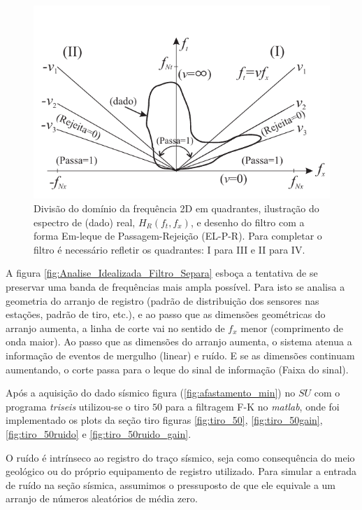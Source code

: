 \begin{figure}[H]
\centering
\includegraphics[width=12cm]{figuras/cap2/Filtro_velocidade.pdf}
\vspace{-0.3cm}
\caption{Divisão do domínio da frequência 2D em quadrantes, ilustração do espectro de (dado) real, $H_{R}(f_{t},f_{x})$, e desenho do filtro com a forma Em-leque de Passagem-Rejeição (EL-P-R). 
Para completar o filtro é necessário refletir os quadrantes: I para III e II para IV.}
\label{fig:Filtro_velocidade}
\end{figure}

A figura \ref{fig:Analise_Idealizada_Filtro_Separa} esboça a tentativa de se preservar uma banda de frequências mais ampla possível. 
Para isto se analisa a geometria do arranjo de registro (padrão de distribuição dos sensores nas estações, padrão de tiro, etc.), e ao passo que as dimensões geométricas do arranjo aumenta, a linha de corte vai no sentido de $f_{x}$ menor (comprimento de onda maior). 
Ao passo que as dimensões do arranjo aumenta, o sistema atenua a informação de eventos de mergulho (linear) e ruído.
E se as dimensões continuam aumentando, o corte passa para o leque do sinal de informação (Faixa do sinal).

Após a aquisição do dado sísmico figura (\ref{fig:afastamento_min}) no $SU$ com o programa \textit{triseis} utilizou-se o tiro $50$ para a filtragem F-K no \textit{matlab}, onde foi implementado os plots da seção tiro figuras \ref{fig:tiro_50}, \ref{fig:tiro_50gain}, \ref{fig:tiro_50ruido} e \ref{fig:tiro_50ruido_gain}. 

O ruído é intrínseco ao registro do traço sísmico, seja como consequência do meio geológico ou do próprio equipamento de registro utilizado. Para simular a entrada de ruído na seção sísmica, assumimos o pressuposto de que ele equivale a um arranjo de números aleatórios de média zero.

